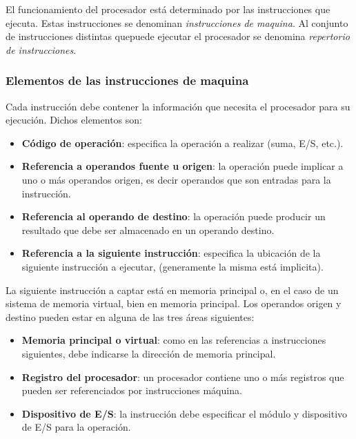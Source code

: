 El funcionamiento del procesador está determinado por las instrucciones que ejecuta. Estas instrucciones se denominan \textit{instrucciones de maquina}. Al conjunto de instrucciones distintas quepuede ejecutar el procesador se denomina \textit{repertorio de instrucciones}.

\begin{subs}
  \subsubsection{Elementos de las instrucciones de maquina}

  Cada instrucción debe contener la información que necesita el procesador para su ejecución. Dichos elementos son:

  \begin{itemize}
    \item \textbf{Código de operación}: especifica la operación a realizar (suma, E/S, etc.).
    \item \textbf{Referencia a operandos fuente u origen}: la operación puede implicar a uno o más operandos origen, es decir operandos que son entradas para la instrucción.
    \item \textbf{Referencia al operando de destino}: la operación puede producir un resultado que debe ser almacenado en un operando destino.
    \item \textbf{Referencia a la siguiente instrucción}: especifica la ubicación de la siguiente instrucción a ejecutar, (generamente la misma está implicita).
  \end{itemize}

  La siguiente instrucción a captar está en memoria principal o, en el caso de un sistema de memoria virtual, bien en memoria principal.
  Los operandos origen y destino pueden estar en alguna de las tres áreas siguientes:

  \begin{itemize}
    \item \textbf{Memoria principal o virtual}: como en las referencias a instrucciones siguientes, debe indicarse la dirección de memoria principal.
    \item \textbf{Registro del procesador}: un procesador contiene uno o más registros que pueden ser referenciados por instrucciones máquina.
    \item \textbf{Dispositivo de E/S}: la instrucción debe especificar el módulo y dispositivo de E/S para la operación.
  \end{itemize}


\end{subs}
